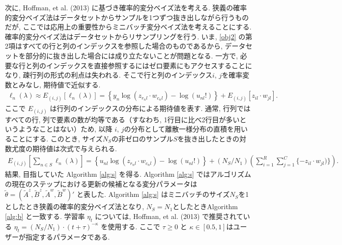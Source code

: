 \documentclass[paper=a4,10.5pt]{jsarticle} %
\numberwithin{equation}{section} %
\begin{document}
次に, Hoffman, et al. (2013) に基づき確率的変分ベイズ法を考える. 狭義の確率的変分ベイズ法はデータセットからサンプルを1つずつ抜き出しながら行うものだが, ここでは応用上の重要性からミニバッチ変分ベイズ法を考えることにする. 確率的変分ベイズ法はデータセットからリサンプリングを行う.   いま, \eqref{obj2} の第2項はすべての行と列のインデックスを参照した場合のものであるから, データセットを部分的に抜き出した場合には成り立たないことが問題となる. 一方で, 必要な行と列のインデックスを直接参照するにはゼロ要素にもアクセスすることになり, 疎行列の形式の利点は失われる. そこで行と列のインデックス$i$, $j$を確率変数とみなし, 期待値で近似する. 
\begin{align}
\ell_n (\lambda) \approx E_{(i,j)} [\ell_n (\lambda)] = \left\{ y_n \log(z_{r_nl} \cdot w_{c_nl})  - \log(u_{nl}!) \right\} + E_{(i,j)} [z_{il} \cdot w_{jl}].
\end{align}
ここで $E_{(i,j)}$ は行列のインデックスの分布による期待値を表す. 通常, 行列ではすべての行, 列で要素の数が均等である（すなわち, 1行目に比べ2行目が多いというようなことはない）ため, 以降 $i$, $j$の分布として離散一様分布の直積を用いることにする. このとき, サイズ$N_S$の非ゼロのサンプル$S$を抜き出したときの対数尤度の期待値は次式で与えられる.
\begin{align}
E_{(i,j)} \left[\sum_{n \in S}  \ell_n (\lambda)\right] = \left\{ u_{nl} \log(z_{r_nl} \cdot w_{c_nl})  - \log(u_{nl}!) \right\} + (N_S/N_1)\left(\sum_{i=1}^R \sum_{j=1}^C \{-z_{il} \cdot w_{jl})\} \right).
\end{align}
結果, 目指していた Algorithm \ref{alg:s} を得る. Algorithm \ref{alg:s} ではアルゴリズムの現在のステップにおける更新の候補となる変分パラメータは $\tilde \theta =(\tilde A^z, \tilde B^z, \tilde A^w, \tilde B^w)'$ と表した. 
Algorithm \ref{alg:s} はミニバッチのサイズ$N_S$を1としたとき狭義の確率的変分ベイズ法となり, $N_S=N_1$としたときAlgorithm \ref{alg:b} と一致する.
学習率 $\eta_t$ については, Hoffman, et al. (2013) で推奨されている $\eta_t = (N_S/N_1) \cdot (t+\tau)^{-\kappa}$ を使用する. ここで $\tau \ge 0$ と $\kappa \in [0.5,1]$はユーザーが指定するパラメータである.
\end{document}
